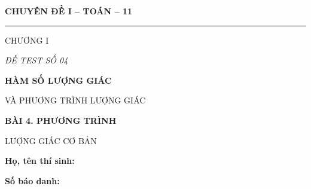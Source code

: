 \documentclass[12pt,a4paper]{article}
\begin{document}
\noindent
\begin{minipage}[t]{.35\textwidth}
  \centering
  {\bfseries CHUYÊN ĐỀ I -- TOÁN -- 11\par}
  \vspace{2pt}\rule{.72\linewidth}{.4pt}\par\vspace{3pt}
  CHƯƠNG I\par\vspace{4pt}
  {\itshape ĐỀ TEST SỐ 04\par}
\end{minipage}\hfill
\begin{minipage}[t]{.62\textwidth}
  \centering
  {\bfseries HÀM SỐ LƯỢNG GIÁC\par
  VÀ PHƯƠNG TRÌNH LƯỢNG GIÁC\par}
  \vspace{5pt}
  {\small\bfseries BÀI 4. PHƯƠNG TRÌNH\par
  LƯỢNG GIÁC CƠ BẢN\par}
\end{minipage}

\vspace{7mm}
\noindent
\begin{minipage}[t]{.72\textwidth}
  \textbf{Họ, tên thí sinh:}\dotfill\par\vspace{3pt}
  \textbf{Số báo danh:}\dotfill
\end{minipage}\hfill
\begin{minipage}[t]{.25\textwidth}
  \raggedleft\setlength{\fboxsep}{4pt}
\end{minipage}
\end{document}
